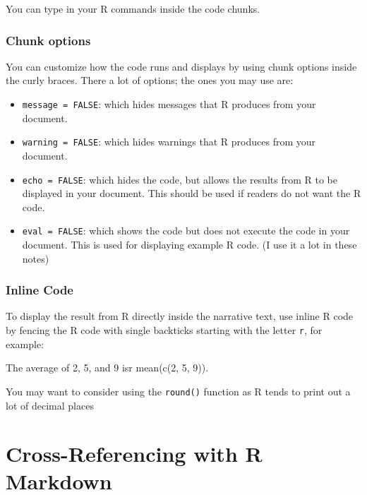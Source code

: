 \documentclass[
]{book}
\newenvironment{Shaded}{\begin{snugshade}}{\end{snugshade}}
\newcommand{\NormalTok}[1]{#1}
\providecommand{\tightlist}{%
  \setlength{\itemsep}{0pt}\setlength{\parskip}{0pt}}
\theoremstyle{definition}
\theoremstyle{definition}
\theoremstyle{definition}
\theoremstyle{definition}
\theoremstyle{remark}
\begin{document}
You can type in your R commands inside the code chunks.

\hypertarget{chunk-options}{%
\subsubsection{Chunk options}\label{chunk-options}}

You can customize how the code runs and displays by using chunk options inside the curly braces. There a lot of options; the ones you may use are:

\begin{itemize}
\tightlist
\item
  \texttt{message\ =\ FALSE}: which hides messages that R produces from your document.
\item
  \texttt{warning\ =\ FALSE}: which hides warnings that R produces from your document.
\item
  \texttt{echo\ =\ FALSE}: which hides the code, but allows the results from R to be displayed in your document. This should be used if readers do not want the R code.
\item
  \texttt{eval\ =\ FALSE}: which shows the code but does not execute the code in your document. This is used for displaying example R code. (I use it a lot in these notes)
\end{itemize}

\hypertarget{inline-code}{%
\subsubsection{Inline Code}\label{inline-code}}

To display the result from R directly inside the narrative text, use inline R code by fencing the R code with single backticks starting with the letter \texttt{r}, for example:

\begin{Shaded}
\begin{Highlighting}[]
\NormalTok{The average of 2, 5, and 9 is\textasciigrave{}r mean(c(2, 5, 9))\textasciigrave{}.}
\end{Highlighting}
\end{Shaded}

You may want to consider using the \texttt{round()} function as R tends to print out a lot of decimal places

\hypertarget{cross-referencing-with-r-markdown}{%
\section{Cross-Referencing with R Markdown}\label{cross-referencing-with-r-markdown}}
\end{document}
